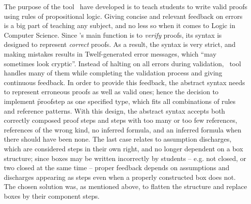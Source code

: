 \documentclass[BA.tex]{subfiles}
\begin{document}
The purpose of the tool \we\ have developed is to teach students to write 
 valid proofs using rules of propositional logic. 
 Giving concise and relevant feedback
 on errors is a big part of teaching any subject, and no less so when it
 comes to Logic in Computer Science. Since \bp 's main function is to
 \emph{verify} proofs, its syntax is designed to represent \emph{correct}
 proofs. As a result, the syntax is very strict, and making mistakes results
 in Twelf-generated error messages, which ``may sometimes look 
 cryptic''\cite[`Dealing with errors']{boxhelp}. Instead of halting on all
 errors during validation, \our\ tool handles many of them while completing 
 the validation process and giving continuous feedback. In order to 
 provide this feedback, the abstract syntax needs to represent erroneous 
 proofs as well as valid ones; hence the decision to implement 
 \f{proofstep} as one specified type, which fits all combinations of rules
 and reference patterns. With this design, the abstract syntax accepts both
 correctly composed proof steps and steps with too many or too few 
 references, references of the wrong kind, no inferred formula, and an
 inferred formula when there should have been none. The last case relates
 to assumption discharges, which are considered steps in their own right,
 and no longer dependent on a box structure; since boxes may be written
 incorrectly by students -- e.g. not closed, or two closed at the same time
 -- proper feedback depends on assumptions and discharges appearing as
 steps even when a properly constructed box does not. The chosen
 solution was, as mentioned above, to flatten the structure and replace
 boxes by their component steps.
\end{document}
